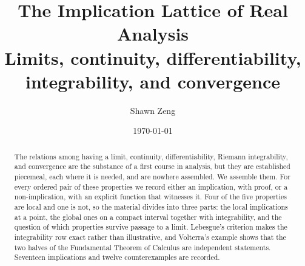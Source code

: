 \documentclass[11pt]{article}
\title{\bfseries The Implication Lattice of Real Analysis\\[2pt]
  \large Limits, continuity, differentiability, integrability,
  and convergence}
\author{Shawn Zeng}
\date{\today}
\begin{document}
\maketitle

\begin{abstract}
\noindent
The relations among having a limit, continuity, differentiability, Riemann
integrability, and convergence are the substance of a first course in
analysis, but they are established piecemeal, each where it is needed, and
are nowhere assembled. We assemble them. For every ordered pair of these
properties we record either an implication, with proof, or a
non-implication, with an explicit function that witnesses it. Four of the
five properties are local and one is not, so the material divides into three
parts: the local implications at a point, the global ones on a compact
interval together with integrability, and the question of which properties
survive passage to a limit. Lebesgue's criterion makes the integrability
row exact rather than illustrative, and Volterra's example shows that the two
halves of the Fundamental Theorem of Calculus are independent statements.
Seventeen implications and twelve counterexamples are recorded.
\end{abstract}







\end{document}
